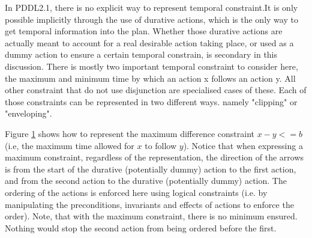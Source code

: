 \documentclass
[a4paper
,english
,parskip=half
,bibliography=totoc
]{scrreprt}
\begin{document}
        In PDDL2.1, there is no explicit way to represent temporal constraint.It is only possible implicitly through the use of durative actions, which is the only way to get temporal information into the plan. Whether those durative actions are actually meant to account for a real desirable action taking place, or used as a dummy action to ensure a certain temporal constrain, is secondary in this discussion. There is mostly two important temporal constraint to consider here, the maximum and minimum time by which an action x follows an action y. All other constraint that do not use disjunction are specialised cases of these. Each of those constraints can be represented in two different ways. namely "clipping"  or "enveloping". 

        Figure \ref{fig:maximum} shows how to represent the maximum difference constraint \(x-y<=b\) (i.e, the maximum time allowed for \(x\) to follow \(y\)). Notice that when expressing a maximum constraint, regardless of the representation, the direction of the arrows is from the start of the durative (potentially dummy) action to the first action, and from the second action to the durative (potentially dummy) action. The ordering of the actions is enforced here using logical constraints (i.e. by manipulating the preconditions, invariants and effects of actions to enforce the order). Note, that with the maximum constraint, there is no minimum ensured. Nothing would stop the second action from being ordered before the first.
        
        \begin{figure}[h]
            \hfill
            \\
            \vfill
            \centering
                \caption{}
                \label{fig:maximum_compact}
        \label{fig:maximum}
        \end{figure}
\end{document}
